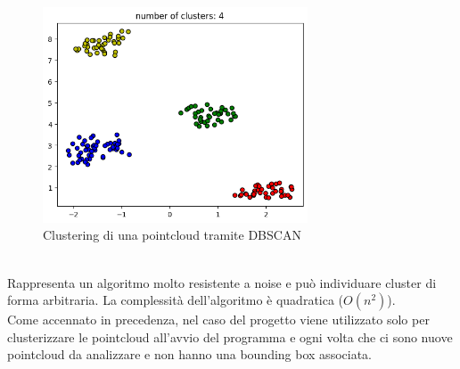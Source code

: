 \documentclass[italian]{report}
\begin{document}
\begin{figure}[H]
	\centering
	\includegraphics[width=0.7\textwidth]{dbscan}
	\footnotesize
	\caption{Clustering di una pointcloud tramite DBSCAN}	
\end{figure}\\
Rappresenta un algoritmo molto resistente a noise e può individuare cluster di forma arbitraria. La complessità dell'algoritmo è quadratica ($O(n^2)$)\cite{DBSCAN}.\\
Come accennato in precedenza, nel caso del progetto viene utilizzato solo per clusterizzare le pointcloud all'avvio del programma e ogni volta che ci sono nuove pointcloud da analizzare e non hanno una bounding box associata.
\end{document}
